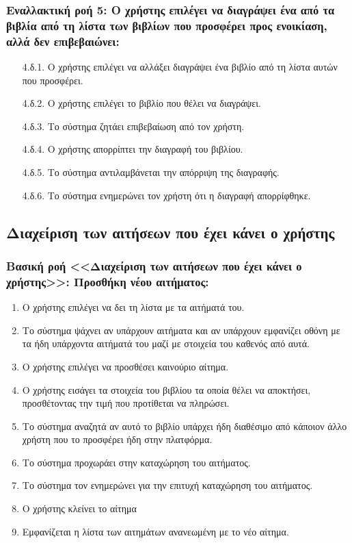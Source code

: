 \documentclass[12pt,a4paper]{article}
\begin{document}
\subsubsection*{Εναλλακτική ροή 5: Ο χρήστης επιλέγει να διαγράψει ένα από τα βιβλία από τη λίστα των βιβλίων που προσφέρει προς ενοικίαση, αλλά δεν επιβεβαιώνει:}
\begin{enumerate}
    \item [4.δ.1.] Ο χρήστης επιλέγει να αλλάξει διαγράψει ένα βιβλίο από τη λίστα αυτών που προσφέρει.
    \item [4.δ.2.] Ο χρήστης επιλέγει το βιβλίο που θέλει να διαγράψει.
    \item [4.δ.3.] Το σύστημα ζητάει επιβεβαίωση από τον χρήστη.
    \item [4.δ.4.] Ο χρήστης απορρίπτει την διαγραφή του βιβλίου.
    \item [4.δ.5.] Το σύστημα αντιλαμβάνεται την απόρριψη της διαγραφής.
    \item [4.δ.6.] Το σύστημα ενημερώνει τον χρήστη ότι η διαγραφή απορρίφθηκε.
\end{enumerate}

\subsection{Διαχείριση των αιτήσεων που έχει κάνει ο χρήστης}

\subsubsection*{Βασική ροή <<Διαχείριση των αιτήσεων που έχει κάνει ο χρήστης>>: Προσθήκη νέου αιτήματος:}
\begin{enumerate}
    \item Ο χρήστης επιλέγει να δει τη λίστα με τα αιτήματά του. 
    \item Το σύστημα ψάχνει αν υπάρχουν αιτήματα και αν υπάρχουν εμφανίζει οθόνη με τα ήδη υπάρχοντα αιτήματά του μαζί με στοιχεία του καθενός από αυτά. 
    \item Ο χρήστης επιλέγει να προσθέσει καινούριο αίτημα.
    \item Ο χρήστης εισάγει τα στοιχεία του βιβλίου τα οποία θέλει να αποκτήσει, προσθέτοντας την τιμή που προτίθεται να πληρώσει. 
    \item Το σύστημα αναζητά αν αυτό το βιβλίο υπάρχει ήδη διαθέσιμο από κάποιον άλλο χρήστη που το προσφέρει ήδη στην πλατφόρμα. 
    \item Το σύστημα προχωράει στην καταχώρηση του αιτήματος. 
    \item Το σύστημα τον ενημερώνει για την επιτυχή καταχώρηση του αιτήματος. 
    \item Ο χρήστης κλείνει το αίτημα
    \item Εμφανίζεται η λίστα των αιτημάτων ανανεωμένη με το νέο αίτημα.
\end{enumerate}
\end{document}
